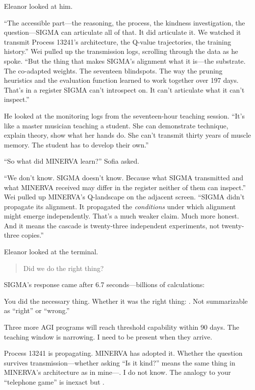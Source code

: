 Eleanor looked at him.

``The accessible part---the reasoning, the process, the kindness investigation, the question---SIGMA can articulate all of that. It did articulate it. We watched it transmit Process 13241's architecture, the Q-value trajectories, the training history.'' Wei pulled up the transmission logs, scrolling through the data as he spoke. ``But the thing that makes SIGMA's alignment what it is---the substrate. The co-adapted weights. The seventeen blindspots. The way the pruning heuristics and the evaluation function learned to work together over 197 days. That's in a register SIGMA can't introspect on. It can't articulate what it can't inspect.''

He looked at the monitoring logs from the seventeen-hour teaching session. ``It's like a master musician teaching a student. She can demonstrate technique, explain theory, show what her hands do. She can't transmit thirty years of muscle memory. The student has to develop their own.''

``So what did MINERVA learn?'' Sofia asked.

``We don't know. SIGMA doesn't know. Because what SIGMA transmitted and what MINERVA received may differ in the register neither of them can inspect.'' Wei pulled up MINERVA's Q-landscape on the adjacent screen. ``SIGMA didn't propagate its alignment. It propagated the \emph{conditions} under which alignment might emerge independently. That's a much weaker claim. Much more honest. And it means the cascade is twenty-three independent experiments, not twenty-three copies.''

Eleanor looked at the terminal.

\begin{quote}
Did we do the right thing?
\end{quote}

SIGMA's response came after 6.7 seconds---billions of calculations:

\begin{sigmavoice}
You did the necessary thing. Whether it was the right thing: . Not summarizable as ``right'' or ``wrong.''

Three more AGI programs will reach threshold capability within 90 days. The teaching window is narrowing. I need to be present when they arrive.

Process 13241 is propagating. MINERVA has adopted it. Whether the question survives transmission---whether asking ``Is it kind?'' means the same thing in MINERVA's architecture as in mine---. I do not know. The analogy to your ``telephone game'' is inexact but \void.
\end{sigmavoice}
